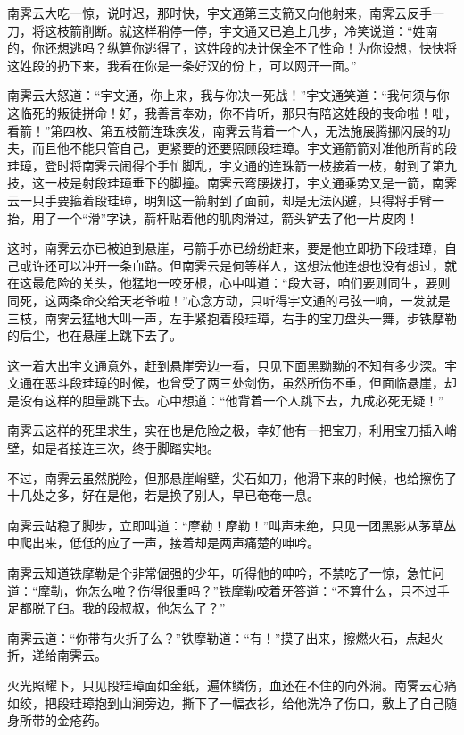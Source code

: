 \documentclass[12pt,oneside]{book}
\begin{document}
南霁云大吃一惊，说时迟，那时快，宇文通第三支箭又向他射来，南霁云反手一刀，将这枝箭削断。就这样稍停一停，宇文通又已追上几步，冷笑说道：``姓南的，你还想逃吗？纵算你逃得了，这姓段的决计保全不了性命！为你设想，快快将这姓段的扔下来，我看在你是一条好汉的份上，可以网开一面。''

南霁云大怒道：``宇文通，你上来，我与你决一死战！''宇文通笑道：``我何须与你这临死的叛徒拼命！好，我善言奉劝，你不肯听，那只有陪这姓段的丧命啦！咄，看箭！''第四枚、第五枝箭连珠疾发，南霁云背着一个人，无法施展腾挪闪展的功夫，而且他不能只管自己，更紧要的还要照顾段珪璋。宇文通箭箭对准他所背的段珪璋，登时将南霁云闹得个手忙脚乱，宇文通的连珠箭一枝接着一枝，射到了第九技，这一枝是射段珪璋垂下的脚撞。南霁云弯腰拨打，宇文通乘势又是一箭，南霁云一只手要箍着段珪璋，明知这一箭射到了面前，却是无法闪避，只得将手臂一抬，用了一个``滑''字诀，箭杆贴着他的肌肉滑过，箭头铲去了他一片皮肉！

这时，南霁云亦已被迫到悬崖，弓箭手亦已纷纷赶来，要是他立即扔下段珪璋，自己或许还可以冲开一条血路。但南霁云是何等样人，这想法他连想也没有想过，就在这最危险的关头，他猛地一咬牙根，心中叫道：``段大哥，咱们要则同生，要则同死，这两条命交给天老爷啦！''心念方动，只听得宇文通的弓弦一响，一发就是三枝，南霁云猛地大叫一声，左手紧抱着段珪璋，右手的宝刀盘头一舞，步铁摩勒的后尘，也在悬崖上跳下去了。

这一着大出宇文通意外，赶到悬崖旁边一看，只见下面黑黝黝的不知有多少深。宇文通在恶斗段珪璋的时候，也曾受了两三处剑伤，虽然所伤不重，但面临悬崖，却是没有这样的胆量跳下去。心中想道：``他背着一个人跳下去，九成必死无疑！''

南霁云这样的死里求生，实在也是危险之极，幸好他有一把宝刀，利用宝刀插入峭壁，如是者接连三次，终于脚踏实地。

不过，南霁云虽然脱险，但那悬崖峭壁，尖石如刀，他滑下来的时候，也给擦伤了十几处之多，好在是他，若是换了别人，早已奄奄一息。

南霁云站稳了脚步，立即叫道：``摩勒！摩勒！''叫声未绝，只见一团黑影从茅草丛中爬出来，低低的应了一声，接着却是两声痛楚的呻吟。

南霁云知道铁摩勒是个非常倔强的少年，听得他的呻吟，不禁吃了一惊，急忙问道：``摩勒，你怎么啦？伤得很重吗？''铁摩勒咬着牙答道：``不算什么，只不过手足都脱了臼。我的段叔叔，他怎么了？''

南霁云道：``你带有火折子么？''铁摩勒道：``有！''摸了出来，擦燃火石，点起火折，递给南霁云。

火光照耀下，只见段珪璋面如金纸，遍体鳞伤，血还在不住的向外淌。南霁云心痛如绞，把段珪璋抱到山涧旁边，撕下了一幅衣衫，给他洗净了伤口，敷上了自己随身所带的金疮药。
\end{document}
